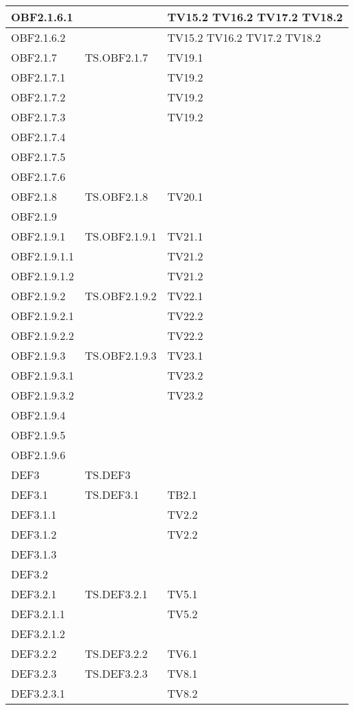 \documentclass{scalatekids-article}
\begin{document}
\begin{longtable}[H]{|l|p{4cm}|p{4cm}|}
\hline
OBF2.1.6.1 & & TV15.2 TV16.2 TV17.2 TV18.2\\
\hline
OBF2.1.6.2 & & TV15.2 TV16.2 TV17.2 TV18.2\\
\hline
OBF2.1.7 & TS.OBF2.1.7 & TV19.1\\
\hline
OBF2.1.7.1 & & TV19.2\\
\hline
OBF2.1.7.2 & & TV19.2\\
\hline
OBF2.1.7.3 & & TV19.2\\
\hline
OBF2.1.7.4 & &\\ %
\hline
OBF2.1.7.5 & &\\ %
\hline
OBF2.1.7.6 & &\\ %
\hline
OBF2.1.8 & TS.OBF2.1.8 & TV20.1\\
\hline
OBF2.1.9 & &\\
\hline
OBF2.1.9.1 & TS.OBF2.1.9.1 & TV21.1\\
\hline
OBF2.1.9.1.1 & & TV21.2\\
\hline
OBF2.1.9.1.2 & & TV21.2\\
\hline
OBF2.1.9.2 & TS.OBF2.1.9.2 & TV22.1\\
\hline
OBF2.1.9.2.1 & & TV22.2\\
\hline
OBF2.1.9.2.2 & & TV22.2\\
\hline
OBF2.1.9.3 & TS.OBF2.1.9.3 & TV23.1\\
\hline
OBF2.1.9.3.1 & & TV23.2\\
\hline
OBF2.1.9.3.2 & & TV23.2\\
\hline
OBF2.1.9.4 & &\\ %
\hline
OBF2.1.9.5 & &\\ %
\hline
OBF2.1.9.6 & &\\ %
\hline
DEF3 & TS.DEF3 & \\
\hline
DEF3.1 & TS.DEF3.1 & TB2.1\\
\hline
DEF3.1.1 & & TV2.2\\
\hline
DEF3.1.2 & & TV2.2\\
\hline
DEF3.1.3 & &\\
\hline
DEF3.2 & &\\
\hline
DEF3.2.1 & TS.DEF3.2.1 & TV5.1 \\
\hline
DEF3.2.1.1 & & TV5.2\\
\hline
DEF3.2.1.2 & &\\
\hline
DEF3.2.2 & TS.DEF3.2.2 & TV6.1\\
\hline
DEF3.2.3 & TS.DEF3.2.3 & TV8.1\\
\hline
DEF3.2.3.1 & & TV8.2\\
\hline

\end{longtable}
\end{document}

